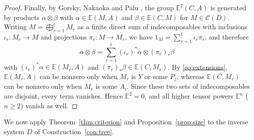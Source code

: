 \documentclass[a4paper,reqno,10pt]{amsart}
\numberwithin{equation}{section}
\theoremstyle{definition}
\newcommand{\C}{\mathcal C}
\newcommand{\E}{\mathbb E}
\begin{document}
\begin{proof}
Finally, by Gorsky, Nakaoka and Palu \cite[Definition~3.1 and Remark~3.2]{GNP},
the group $\E^2(C,A)$ is generated by products $\alpha\otimes\beta$ with
$\alpha\in\E(M,A)$ and $\beta\in\E(C,M)$ for $M\in\C(D)$. Writing
$M=\bigoplus_{r=1}^t M_r$ as a finite direct sum of indecomposables with
inclusions $\iota_r:M_r\to M$ and projections $\pi_r:M\to M_r$, we have
$1_M=\sum_{r=1}^t\iota_r\pi_r$, and therefore
\[
  \alpha\otimes\beta
  =\sum_{r=1}^t (\iota_r)^*\alpha\otimes(\pi_r)_*\beta
\]
with $(\iota_r)^*\alpha\in\E(M_r,A)$ and $(\pi_r)_*\beta\in\E(C,M_r)$. By
\eqref{eq:extensions}, $\E(M_r,A)$ can be nonzero only when $M_r$ is $Y$ or
some $P_j$, whereas $\E(C,M_r)$ can be nonzero only when $M_r$ is some $A_i$.
Since these two sets of indecomposables are disjoint, every term vanishes.
Hence $\E^2=0$, and all higher tensor powers $\E^n$ ($n\ge 2$) vanish as well.
\end{proof}

We now apply Theorem~\ref{thm:criterion} and Proposition~\ref{prop:size} to the
inverse system $D$ of Construction~\ref{con:tree}.
\end{document}

